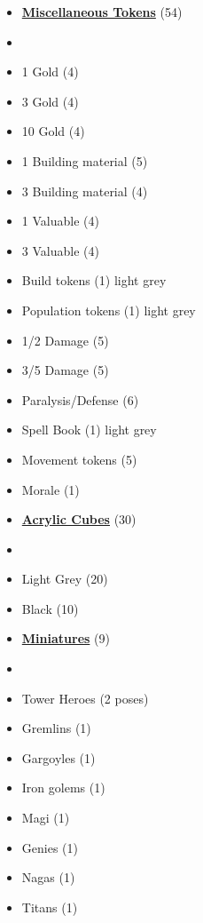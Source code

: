 \begin{multicols}{3}
\begin{itemize}[leftmargin=0pt, label={}, noitemsep, noitemsep]
  \item \textbf{\small{\underline{Miscellaneous Tokens}}} (54)
  \item
  \item 1 Gold (4)
  \item 3 Gold (4)
  \item 10 Gold (4)
  \item 1 Building material (5)
  \item 3 Building material (4)
  \item 1 Valuable (4)
  \item 3 Valuable (4)
  \item Build tokens (1) {light grey}
  \item Population tokens (1) {light grey}
  \item 1/2 Damage (5)
  \item 3/5 Damage (5)
  \item Paralysis/Defense (6)
  \item Spell Book (1) {light grey}
  \item Movement tokens (5)
  \item Morale (1)
\end{itemize}

\begin{itemize}[leftmargin=0pt, label={}, noitemsep, noitemsep]
  \item \textbf{\small{\underline{Acrylic Cubes}}} (30)
  \item
  \item Light Grey (20)
  \item Black (10)
\end{itemize}
\columnbreak
\begin{itemize}[leftmargin=0pt, label={}, noitemsep, noitemsep]
  \item \textbf{\small{\underline{Miniatures}}} (9)
  \item
  \item Tower Heroes (2 poses)
  \item Gremlins (1)
  \item Gargoyles (1)
  \item Iron golems (1)
  \item Magi (1)
  \item Genies (1)
  \item Nagas (1)
  \item Titans (1)
\end{itemize}


\end{multicols}
